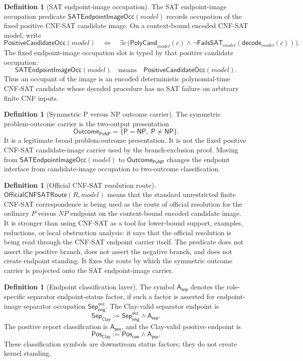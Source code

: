 \documentclass[11pt]{article}
\theoremstyle{definition}
\newtheorem{definition}[theorem]{Definition}
\theoremstyle{remark}
\newcommand{\PosRaw}{\mathsf{Pos}_{\mathsf{raw}}}
\newcommand{\SepImgOcc}{\mathsf{Sep}_{\mathsf{img}}^{\mathsf{occ}}}
\newcommand{\Asep}{\mathsf{A}_{\mathsf{sep}}}
\newcommand{\SepClay}{\mathsf{Sep}_{\mathsf{Clay}}}
\newcommand{\Apos}{\mathsf{A}_{\mathsf{pos}}}
\newcommand{\PosClay}{\mathsf{Pos}_{\mathsf{Clay}}}
\newcommand{\Pclass}{\mathsf{P}}
\newcommand{\NPclass}{\mathsf{NP}}
\newcommand{\PolyCand}{\mathsf{PolyCand}}
\newcommand{\FailsSAT}{\mathsf{FailsSAT}}
\newcommand{\Decode}{\mathsf{decode}}
\newcommand{\SATEndpointImageOcc}{\mathsf{SATEndpointImageOcc}}
\newcommand{\PositiveCandidateOcc}{\mathsf{PositiveCandidateOcc}}
\newcommand{\OutcomePvNP}{\mathsf{Outcome}_{\mathsf{PvNP}}}
\newcommand{\OfficialCNFSATRoute}{\mathsf{OfficialCNFSATRoute}}
\begin{document}
\begin{definition}[SAT endpoint-image occupation]\label{def:sat-endpoint-image-occupation}
The SAT endpoint-image occupation predicate \(\SATEndpointImageOcc(model)\) records occupation of the fixed positive CNF-SAT candidate image. On a context-bound encoded CNF-SAT model, write
\[
  \PositiveCandidateOcc(model)
  \quad\Longleftrightarrow\quad
  \exists c\,\bigl(\PolyCand_{model}(c)\wedge
  \neg\FailsSAT_{model}(\Decode_{model}(c))\bigr).
\]
The fixed endpoint-image occupation slot is typed by that positive candidate occupation:
\[
  \SATEndpointImageOcc(model)\quad\text{means}\quad
  \PositiveCandidateOcc(model).
\]
Thus an occupant of the image is an encoded deterministic polynomial-time CNF-SAT candidate whose decoded procedure has no SAT failure on arbitrary finite CNF inputs.
\end{definition}

\begin{definition}[Symmetric P versus NP outcome carrier]\label{def:symmetric-outcome-carrier}
The symmetric problem-outcome carrier is the two-output presentation
\[
  \OutcomePvNP=\{\Pclass=\NPclass,\;\Pclass\neq\NPclass\}.
\]
It is a legitimate broad problem-outcome presentation. It is not the fixed positive CNF-SAT candidate-image carrier used by the branch-exclusion proof. Moving from \(\SATEndpointImageOcc(model)\) to \(\OutcomePvNP\) changes the endpoint interface from candidate-image occupation to two-outcome classification.
\end{definition}

\begin{definition}[Official CNF-SAT resolution route]\label{def:official-cnf-sat-resolution-route}
\(\OfficialCNFSATRoute(R,model)\) means that the standard unrestricted finite CNF-SAT correspondence is being used as the route of official resolution for the ordinary \(P\) versus \(NP\) endpoint on the context-bound encoded candidate image. It is stronger than using CNF-SAT as a tool for lower-bound support, examples, reductions, or local obstruction analysis: it says that the official resolution is being read through the CNF-SAT endpoint carrier itself. The predicate does not assert the positive branch, does not assert the negative branch, and does not create endpoint standing. It fixes the route by which the symmetric outcome carrier is projected onto the SAT endpoint-image carrier.
\end{definition}

\begin{definition}[Endpoint classification layer]\label{def:clay-layer}
The symbol \(\Asep\) denotes the role-specific separator endpoint-status factor, if such a factor is asserted for endpoint-image separator occupation \(\SepImgOcc\). The Clay-valid separator endpoint is
\[
  \SepClay := \SepImgOcc\wedge\Asep.
\]
The positive report classification is \(\Apos\), and the Clay-valid positive endpoint is
\[
  \PosClay:=\PosRaw\wedge\Apos.
\]
These classification symbols are downstream status factors; they do not create kernel standing.

\end{definition}
\end{document}
